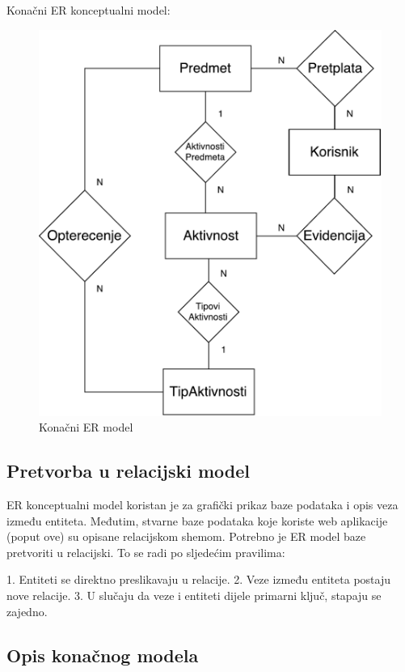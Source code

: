 \documentclass[times, utf8, zavrsni]{fer}
\begin{document}
Konačni ER konceptualni model:

\begin{figure}[H]
\centering
\includegraphics[width=\textwidth,height=\textheight,keepaspectratio]{img/er-model.pdf}
\caption{Konačni ER model}
\label{fig:er-model}
\end{figure}

\subsection{Pretvorba u relacijski model}
ER konceptualni model koristan je za grafički prikaz baze podataka i opis veza između entiteta. Međutim, stvarne baze podataka koje koriste web aplikacije (poput ove) su opisane relacijskom shemom. Potrebno je ER model baze pretvoriti u relacijski. To se radi po sljedećim pravilima:

1. Entiteti se direktno preslikavaju u relacije.
2. Veze između entiteta postaju nove relacije.
3. U slučaju da veze i entiteti dijele primarni ključ, stapaju se zajedno.

\subsection{Opis konačnog modela}
\lstset{language=SQL, tabsize=4}

\end{document}
